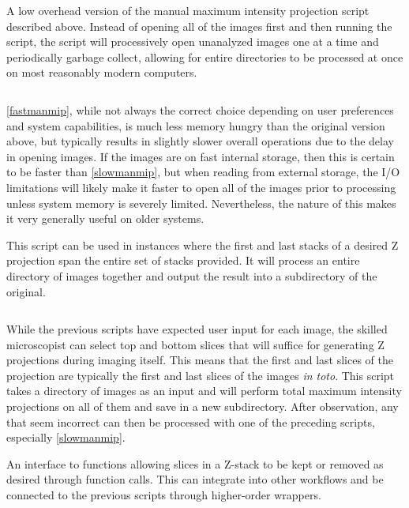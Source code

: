 \begin{code}
\caption{A low overhead version of the manual maximum intensity projection script described above. Instead of opening all of the images first and then running the script, the script will processively open unanalyzed images one at a time and periodically garbage collect, allowing for entire directories to be processed at once on most reasonably modern computers.}
\label{fastmanmip}

\inputminted[breaklines,frame=single]{python}{source/fast_manMIPper.py}

\end{code}

\autoref{fastmanmip}, while not always the correct choice depending on user preferences and system capabilities, is much less memory hungry than the original version above, but typically results in slightly slower overall operations due to the delay in opening images. If the images are on fast internal storage, then this is certain to be faster than \autoref{slowmanmip}, but when reading from external storage, the I/O limitations will likely make it faster to open all of the images prior to processing unless system memory is severely limited. Nevertheless, the nature of this makes it very generally useful on older systems.

\begin{code}
\caption{This script can be used in instances where the first and last stacks of a desired Z projection span the entire set of stacks provided. It will process an entire directory of images together and output the result into a subdirectory of the original.}
\label{bulkmip}

\inputminted[breaklines,frame=single]{python}{source/bulkMIPper.py}

\end{code}

While the previous scripts have expected user input for each image, the skilled microscopist can select top and bottom slices that will suffice for generating Z projections during imaging itself. This means that the first and last slices of the projection are typically the first and last slices of the images \textit{in toto}. This script takes a directory of images as an input and will perform total maximum intensity projections on all of them and save in a new subdirectory. After observation, any that seem incorrect can then be processed with one of the preceding scripts, especially \autoref{slowmanmip}. 

\begin{code}
\caption{An interface to functions allowing slices in a Z-stack to be kept or removed as desired through function calls. This can integrate into other workflows and be connected to the previous scripts through higher-order wrappers.}
\label{reslicer}

\inputminted[breaklines,frame=single]{python}{source/reSlicer.py}

\end{code}

